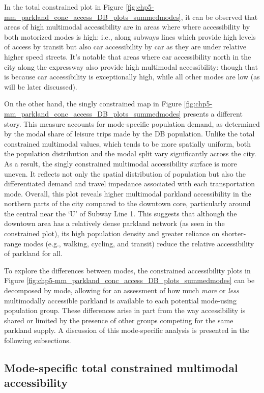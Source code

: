 \documentclass[
11pt, %
oneside, %
english, %
singlespacing, %
]{macthesis} %
\begin{document}
In the total constrained plot in Figure \ref{fig:chp5-mm_parkland_conc_access_DB_plots_summedmodes}, it can be observed that areas of high multimodal accessibility are in areas where where accessibility by both motorized modes is high: i.e., along subways lines which provide high levels of access by transit but also car accessibility by car as they are under relative higher speed streets. It's notable that areas where car accessibility north in the city along the expressway also provide high multimodal accessibility: though that is because car accessibility is exceptionally high, while all other modes are low (as will be later discussed).

On the other hand, the singly constrained map in Figure \ref{fig:chp5-mm_parkland_conc_access_DB_plots_summedmodes} presents a different story. This measure accounts for mode-specific population demand, as determined by the modal share of leisure trips made by the DB population. Unlike the total constrained multimodal values, which tends to be more spatially uniform, both the population distribution and the modal split vary significantly across the city. As a result, the singly constrained multimodal accessibility surface is more uneven. It reflects not only the spatial distribution of population but also the differentiated demand and travel impedance associated with each transportation mode. Overall, this plot reveals higher multimodal parkland accessibility in the northern parts of the city compared to the downtown core, particularly around the central near the `U' of Subway Line 1. This suggests that although the downtown area has a relatively dense parkland network (as seen in the constrained plot), its high population density and greater reliance on shorter-range modes (e.g., walking, cycling, and transit) reduce the relative accessibility of parkland for all.

To explore the differences between modes, the constrained accessibility plots in Figure \ref{fig:chp5-mm_parkland_conc_access_DB_plots_summedmodes} can be decomposed by mode, allowing for an assessment of how much \emph{more} or \emph{less} multimodally accessible parkland is available to each potential mode-using population group. These differences arise in part from the way accessibility is shared or limited by the presence of other groups competing for the same parkland supply. A discussion of this mode-specific analysis is presented in the following subsections.

\subsection{Mode-specific total constrained multimodal accessibility}\label{mode-specific-total-constrained-multimodal-accessibility}
\end{document}
